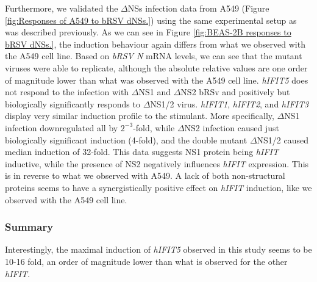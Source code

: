 Furthermore, we validated the \(\Delta\)NSs infection data from A549 (Figure \ref{fig:Responses of A549 to bRSV dNSs.}) using the same experimental setup as was described previously. As we can see in Figure \ref{fig:BEAS-2B responses to bRSV dNSs.}, the induction behaviour again differs from what we observed with the A549 cell line. Based on \textit{bRSV N} mRNA levels, we can see that the mutant viruses were able to replicate, although the absolute relative values are one order of magnitude lower than what was observed with the A549 cell line. \textit{hIFIT5} does not respond to the infection with \(\Delta\)NS1 and \(\Delta\)NS2 bRSv and positively but biologically significantly responds to \(\Delta\)NS1/2 virus. \textit{hIFIT1}, \textit{hIFIT2}, and \textit{hIFIT3} display very similar induction profile to the stimulant. More specifically, \(\Delta\)NS1 infection downregulated all by \(2^{-3}\)-fold, while \(\Delta\)NS2 infection caused just biologically significant induction (4-fold), and the double mutant \(\Delta\)NS1/2 caused median induction of 32-fold. This data suggests NS1 protein being \textit{hIFIT} inductive, while the presence of NS2 negatively influences \textit{hIFIT} expression. This is in reverse to what we observed with A549. A lack of both non-structural proteins seems to have a synergistically positive effect on \textit{hIFIT} induction, like we observed with the A549 cell line.

\subsubsection*{Summary} \label{Summary-human-induction}
Interestingly, the maximal induction of \textit{hIFIT5} observed in this study seems to be 10-16 fold, an order of magnitude lower than what is observed for the other \textit{hIFIT}.